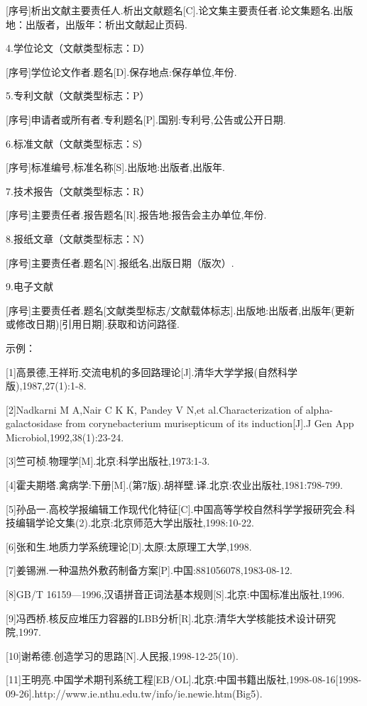[序号]析出文献主要责任人.析出文献题名[C].论文集主要责任者.论文集题名.出版地：出版者，出版年：析出文献起止页码.

4.学位论文（文献类型标志：D）

[序号]学位论文作者.题名[D].保存地点:保存单位,年份.

5.专利文献（文献类型标志：P）

[序号]申请者或所有者.专利题名[P].国别:专利号,公告或公开日期.

6.标准文献（文献类型标志：S）

[序号]标准编号,标准名称[S].出版地:出版者,出版年.

7.技术报告（文献类型标志：R）

[序号]主要责任者.报告题名[R].报告地:报告会主办单位,年份.

8.报纸文章（文献类型标志：N）

[序号]主要责任者.题名[N].报纸名,出版日期（版次）.

9.电子文献

[序号]主要责任者.题名[文献类型标志/文献载体标志].出版地:出版者,出版年(更新或修改日期)[引用日期].获取和访问路径.

示例：

[1]高景德,王祥珩.交流电机的多回路理论[J].清华大学学报(自然科学版),1987,27(1):1-8.

[2]Nadkarni M A,Nair C K K, Pandey V N,et al.Characterization of alpha-galactosidase from corynebacterium murisepticum of its induction[J].J Gen App Microbiol,1992,38(1):23-24.

[3]竺可桢.物理学[M].北京:科学出版社,1973:1-3.

[4]霍夫期塔.禽病学:下册[M].(第7版).胡祥壁.译.北京:农业出版社,1981:798-799.

[5]孙品一.高校学报编辑工作现代化特征[C].中国高等学校自然科学学报研究会.科技编辑学论文集(2).北京:北京师范大学出版社,1998:10-22.

[6]张和生.地质力学系统理论[D].太原:太原理工大学,1998.

[7]姜锡洲.一种温热外敷药制备方案[P].中国:881056078,1983-08-12.

[8]GB/T 16159—1996,汉语拼音正词法基本规则[S].北京:中国标准出版社,1996.

[9]冯西桥.核反应堆压力容器的LBB分析[R].北京:清华大学核能技术设计研究院,1997.

[10]谢希德.创造学习的思路[N].人民报,1998-12-25(10).

[11]王明亮.中国学术期刊系统工程[EB/OL].北京:中国书籍出版社,1998-08-16[1998-09-26].http://www.ie.nthu.edu.tw/info/ie.newie.htm(Big5).

